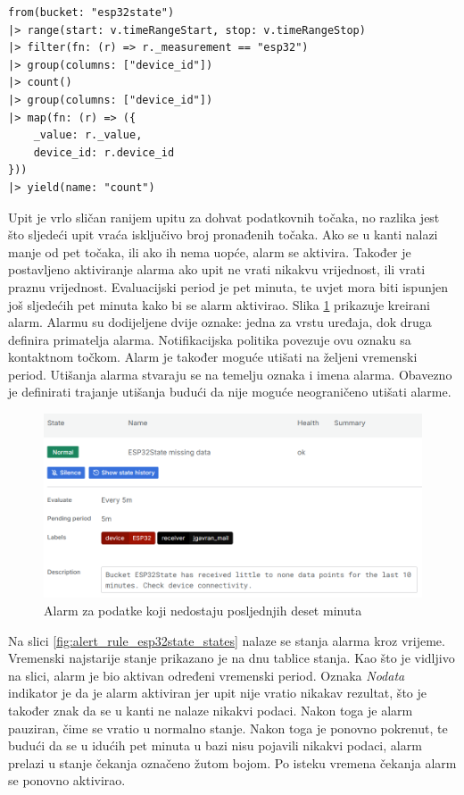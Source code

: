 \begin{lstlisting}[caption={caption text}, language=flux]
from(bucket: "esp32state")
|> range(start: v.timeRangeStart, stop: v.timeRangeStop)
|> filter(fn: (r) => r._measurement == "esp32")
|> group(columns: ["device_id"])
|> count()
|> group(columns: ["device_id"])
|> map(fn: (r) => ({ 
	_value: r._value,
	device_id: r.device_id
}))
|> yield(name: "count")
\end{lstlisting}

Upit je vrlo sličan ranijem upitu za dohvat podatkovnih točaka, no razlika jest što sljedeći upit vraća isključivo broj pronađenih točaka. Ako se u kanti nalazi manje od pet točaka, ili ako ih nema uopće, alarm se aktivira. Također je postavljeno aktiviranje alarma ako upit ne vrati nikakvu vrijednost, ili vrati praznu vrijednost. Evaluacijski period je pet minuta, te uvjet mora biti ispunjen još sljedećih pet minuta kako bi se alarm aktivirao. Slika \ref{fig:alert_rule_esp32state} prikazuje kreirani alarm. Alarmu su dodijeljene dvije oznake: jedna za vrstu uređaja, dok druga definira primatelja alarma. Notifikacijska politika povezuje ovu oznaku sa kontaktnom točkom. Alarm je također moguće utišati na željeni vremenski period. Utišanja alarma  stvaraju se na temelju oznaka i imena alarma. Obavezno je definirati trajanje utišanja budući da nije moguće neograničeno utišati alarme. 

\begin{figure}[ht]
	\centering
	\includegraphics[scale=0.6]{imgs/alert_rule_esp32state}
	\caption{Alarm za podatke koji nedostaju posljednjih deset minuta}
	\label{fig:alert_rule_esp32state}
\end{figure}

Na slici \ref{fig:alert_rule_esp32state_states} nalaze se stanja alarma kroz vrijeme. Vremenski najstarije stanje prikazano je na dnu tablice stanja. Kao što je vidljivo na slici, alarm je bio aktivan određeni vremenski period. Oznaka \textit{Nodata} indikator je da je alarm aktiviran jer upit nije vratio nikakav rezultat, što je također znak da se u kanti ne nalaze nikakvi podaci. Nakon toga je alarm pauziran, čime se vratio u normalno stanje. Nakon toga je ponovno pokrenut, te budući da se u idućih pet minuta u bazi nisu pojavili nikakvi podaci, alarm prelazi u stanje čekanja označeno žutom bojom. Po isteku vremena čekanja alarm se ponovno aktivirao. 

